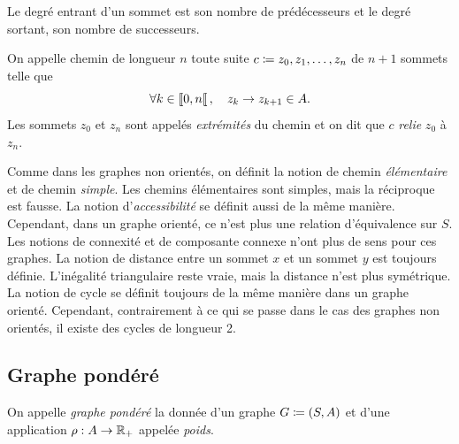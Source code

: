 \documentclass{magnolia}
\begin{document}
\begin{remarqueUnique}
\remarque Le degré entrant d'un sommet est son nombre de prédécesseurs et le
  degré sortant, son nombre de successeurs.
\end{remarqueUnique}

\begin{definition}
On appelle
chemin de longueur $n$ toute suite $c\coloneqq z_0,z_1,\ldots,z_{n}$ de $n+1$ sommets telle que
\[\forall k\in\left\llbracket 0,n\right\llbracket,\quad z_k \to z_{k+1}\in A.\]
Les sommets $z_0$ et $z_n$ sont appelés \emph{extrémités} du chemin et on dit que $c$
\emph{relie} $z_0$ à $z_n$. 
\end{definition}

\begin{remarques}
\remarque Comme dans les graphes non orientés, on définit la notion de chemin
  \emph{élémentaire} et de chemin \emph{simple}. Les chemins élémentaires sont simples,
  mais la réciproque est fausse.
\remarque La notion d'\emph{accessibilité} se définit aussi de la même manière. Cependant,
  dans un graphe orienté, ce n'est plus une relation d'équivalence sur $S$.
  Les notions de connexité et de composante connexe n'ont plus de sens
  pour ces graphes.
\remarque La notion de distance entre un sommet $x$ et un sommet $y$ est toujours définie. L'inégalité triangulaire reste vraie, mais
  la distance n'est plus symétrique.
\remarque La notion de cycle se définit toujours de la même manière dans un graphe
  orienté. Cependant, contrairement à ce qui se passe dans le cas des graphes non orientés,
  il existe des cycles de longueur 2.
\end{remarques}

\subsection{Graphe pondéré}

\begin{definition}
  On appelle \emph{graphe pondéré} la donnée d'un graphe
  $G\coloneqq\left(S,A\right)$ et d'une application
  $\rho:A\to\mathbb{R}_+$ appelée \emph{poids}.
  \end{definition}
\end{document}
